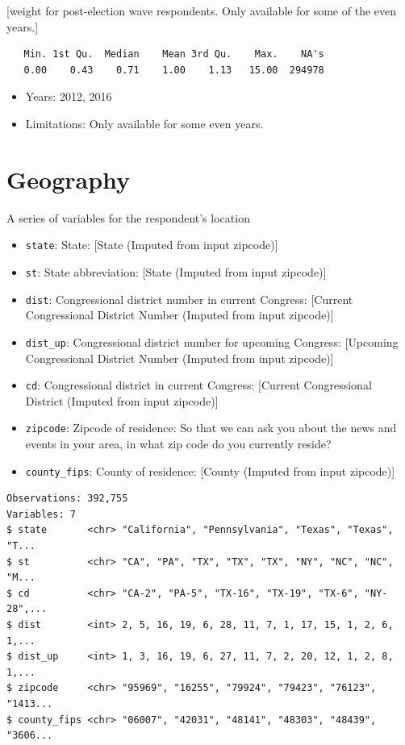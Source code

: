 \documentclass[10pt,article,oneside]{memoir}
\theoremstyle{definition}
\begin{document}
{[}weight for post-election wave respondents. Only available for some of
the even years.{]}

\begin{verbatim}
   Min. 1st Qu.  Median    Mean 3rd Qu.    Max.    NA's 
   0.00    0.43    0.71    1.00    1.13   15.00  294978 
\end{verbatim}

\begin{itemize}
\tightlist
\item
  Years: 2012, 2016
\item
  Limitations: Only available for some even years.
\end{itemize}

\section{Geography}\label{geography}

A series of variables for the respondent's location

\begin{itemize}
\tightlist
\item
  \texttt{state}: State: {[}State (Imputed from input zipcode){]}
\item
  \texttt{st}: State abbreviation: {[}State (Imputed from input
  zipcode){]}
\item
  \texttt{dist}: Congressional district number in current Congress:
  {[}Current Congressional District Number (Imputed from input
  zipcode){]}
\item
  \texttt{dist\_up}: Congressional district number for upcoming
  Congress: {[}Upcoming Congressional District Number (Imputed from
  input zipcode){]}
\item
  \texttt{cd}: Congressional district in current Congress: {[}Current
  Congressional District (Imputed from input zipcode){]}
\item
  \texttt{zipcode}: Zipcode of residence: So that we can ask you about
  the news and events in your area, in what zip code do you currently
  reside?
\item
  \texttt{county\_fips}: County of residence: {[}County (Imputed from
  input zipcode){]}
\end{itemize}

\begin{verbatim}
Observations: 392,755
Variables: 7
$ state       <chr> "California", "Pennsylvania", "Texas", "Texas", "T...
$ st          <chr> "CA", "PA", "TX", "TX", "TX", "NY", "NC", "NC", "M...
$ cd          <chr> "CA-2", "PA-5", "TX-16", "TX-19", "TX-6", "NY-28",...
$ dist        <int> 2, 5, 16, 19, 6, 28, 11, 7, 1, 17, 15, 1, 2, 6, 1,...
$ dist_up     <int> 1, 3, 16, 19, 6, 27, 11, 7, 2, 20, 12, 1, 2, 8, 1,...
$ zipcode     <chr> "95969", "16255", "79924", "79423", "76123", "1413...
$ county_fips <chr> "06007", "42031", "48141", "48303", "48439", "3606...
\end{verbatim}
\end{document}
